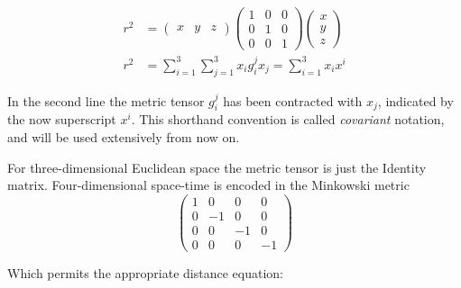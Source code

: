     \begin{equation} \begin{split}
        r^2 &= \begin{pmatrix} x & y & z\end{pmatrix}
            \begin{pmatrix}
                1 & 0 & 0 \\
                0 & 1 & 0 \\
                0 & 0 & 1
            \end{pmatrix}
            \begin{pmatrix} x \\ y \\ z \end{pmatrix} \\
        r^2 &= \sum\limits_{i=1}^3 \sum\limits_{j=1}^3 x_i g_i^j x_j
            = \sum\limits_{i=1}^3 x_i x^i
    \end{split} \end{equation}

    In the second line the metric tensor $g_i^j$ has been contracted with $x_j$,
        indicated by the now superscript $x^i$.
    This shorthand convention is called \textit{covariant} notation, and will be used extensively from now on.

    For three-dimensional Euclidean space the metric tensor is just the Identity matrix.
    Four-dimensional space-time is encoded in the Minkowski metric
    \begin{equation}
        \begin{pmatrix}
            1 &  0 &  0 &  0 \\
            0 & -1 &  0 &  0 \\
            0 &  0 & -1 &  0 \\
            0 &  0 &  0 & -1
        \end{pmatrix}
    \end{equation}

    Which permits the appropriate distance equation:


